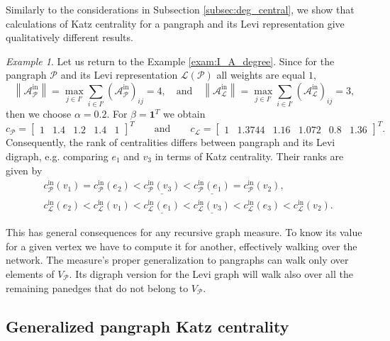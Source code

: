 \documentclass[a4paper,12pt]{article}
\theoremstyle{definition}
\theoremstyle{remark}
\newtheorem{exam}{Example}
\newcommand{\mP}{\mathcal{P}}
\newcommand{\mL}{\mathcal{L}}
\newcommand{\tin}{\mathrm{in}}
\begin{document}
Similarly to the considerations in Subsection \ref{subsec:deg_central}, we show that calculations of Katz centrality for a pangraph and its Levi representation give qualitatively different results.

\begin{exam}
Let us return to the Example \ref{exam:I_A_degree}. Since for the pangraph $\mP$ and its Levi representation $\mL(\mP)$ all weights are equal $1$, $$\left\|\mathcal{A}^{\tin}_{\mP}\right\|=\max_{j\in I'}\sum_{i\in I'}(\mathcal{A}^{\tin}_{\mP})_{ij}=4,\quad  \textrm{and} \quad \left\|\mathcal{A}^{\tin}_{\mL}\right\|=\max_{j\in I'}\sum_{i\in I'}(\mathcal{A}^{\tin}_{\mL})_{ij}=3,$$
then we choose $\alpha=0.2$. For $\beta=\mathbf{1}^T$ we obtain
\begin{equation*} c_{\mP}=\left[\begin{array}{ccccc}1&1.4&1.2&1.4&1\end{array}\right]^T\qquad \textrm{and}\qquad  c_{\mL}= \left[\begin{array}{cccccc}1&1.3744&1.16&1.072&0.8&1.36\end{array}\right]^T.
\end{equation*}
Consequently, the rank of centralities differs between pangraph and its Levi digraph, e.g. comparing $e_1$ and $v_3$ in terms of Katz centrality. Their ranks are given by \begin{eqnarray*}
&c_{\mP}^{\tin}(v_1)=c_{\mP}^{\tin} (e_2)<\underline{c_{\mP}^{\tin} (v_3)}<\underline{c_{\mP}^{\tin} (e_1)}=c_{\mP}^{\tin} (v_2), \\[0.4cm]
&c_{\mL}^{\tin} (e_2)<c_{\mL}^{\tin} (v_1)<\underline{c_{\mL}^{\tin} (e_1)}<\underline{c_{\mL}^{\tin} (v_3)}<c_{\mL}^{\tin} (e_3) < c_{\mL}^{\tin} (v_2).
\end{eqnarray*}
\end{exam}

This has general consequences for any recursive graph measure. To know its value for a given vertex we have to compute it for another, effectively walking over the network. The measure's proper generalization to pangraphs can walk only over elements of $V_{\mP}$. Its digraph version for the Levi graph will walk also over all the remaining panedges that do not belong to $V_{\mP}$.


\subsection{Generalized pangraph Katz centrality}\label{sec:gen_pan_Katz}
\end{document}
